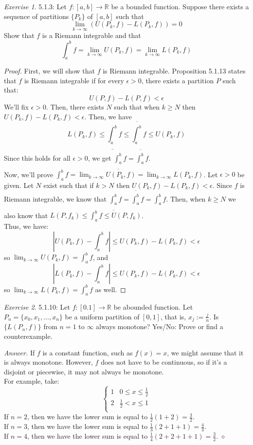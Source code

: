 \documentclass[12pt,oneside]{amsart}
\theoremstyle{definition}
\theoremstyle{remark}
\newtheorem{exer}{Exercise}
\numberwithin{equation}{exer}
\newenvironment{answer}{\bigskip\noindent\emph{Answer.}}{\hfill$\diamond$\newline}
\newcommand{\upRiemannint}[2]{
  \overline{\int_{#1}^{#2}}
}
\newcommand{\loRiemannint}[2]{
  \underline{\int_{#1}^{#2}}
}
\begin{document}
\newpage
\begin{exer}
5.1.3: Let $f:[a,b]\rightarrow \mathbb{R}$ be a bounded function. Suppose there exists a sequence of partitions $\{ P_k \}$ of $[a,b]$ such that
$$ \lim_{k\to\infty} (U(P_k,f)-L(P_k,f))=0$$
Show that $f$ is a Riemann integrable and that
$$\int_{a}^{b}f=\lim_{k\to\infty} U(P_k,f)=\lim_{k\to\infty}L(P_k,f)$$
\end{exer}
\begin{proof}
First, we will show that $f$ is Riemann integrable. Proposition 5.1.13 states that $f$ is Riemann integrable if for every $\epsilon >0$, there exists a partition $P$ such that:
$$U(P,f)-L(P,f)<\epsilon$$
We'll fix $\epsilon >0$. Then, there exists $N$ such that when $k\geq N$ then \\ $U(P_k,f)-L(P_k,f)<\epsilon$. Then, we have 
$$L(P_k,f)\leq \loRiemannint{a}{b}f \leq \upRiemannint{a}{b}f \leq U(P_k,f) $$
Since this holds for all $\epsilon >0$, we get $\loRiemannint{a}{b}f=\upRiemannint{a}{b}f$.
\\
Now, we'll prove $\int_{a}^{b}f=\lim_{k\to\infty} U(P_k,f)=\lim_{k\to\infty}L(P_k,f)$. Let $\epsilon >0$ be given. Let $N$ exist such that if $k>N$ then $U(P_k,f)-L(P_k,f)<\epsilon$. 
Since $f$ is Riemann integrable, we know that $\loRiemannint{a}{b}f=\upRiemannint{a}{b}f=\int_{a}^{b}f$. Then, when $k \geq N$ we also know that $L(P,f_k)\leq \int_{a}^{b}f \leq U(P,f_k)$. \\
Thus, we have:
$$|U(P_k,f)-\int_{a}^{b}f|\leq U(P_k,f)-L(P_k,f) < \epsilon$$ so $\lim_{k\to\infty}U(P_k,f)=\int_{a}^{b}f$, and $$|L(P_k,f)-\int_{a}^{b}f|\leq U(P_k,f)-L(P_k,f) < \epsilon$$ so $\lim_{k\to\infty}L(P_k,f)=\int_{a}^{b}f$ as well.
\end{proof}

\newpage
\begin{exer}
5.1.10: Let $f:[0.1]\rightarrow \mathbb{R}$ be abounded function. Let $P_n=\{x_0,x_1,...,x_n\}$ be a uniform partition of $[0,1]$, that is, $x_j:=\frac{j}{n}$. Is $\{L(P_n,f)\}$ from $n=1$ to $\infty$ always monotone? Yes/No: Prove or find a counterexample.
\end{exer}
\begin{answer}
If $f$ is a constant function, such as $f(x)=x$, we might assume that it is always monotone. However, $f$ does not have to be continuous, so if it's a disjoint or piecewise, it may not always be monotone.\\
For example, take:
\[ \begin{cases} 
      1 & 0\leq x \leq \frac{1}{2} \\
      2 & \frac{1}{2} < x \leq 1 \\
   \end{cases}
\]
If $n=2$, then we have the lower sum is equal to $\frac{1}{2}(1+2)=\frac{3}{2}$. \\
If $n=3$, then we have the lower sum is equal to $\frac{1}{3}(2+1+1)=\frac{4}{3}$. \\
If $n=4$, then we have the lower sum is equal to $\frac{1}{4}(2+2+1+1)=\frac{3}{2}$.
\end{answer}
\end{document}
